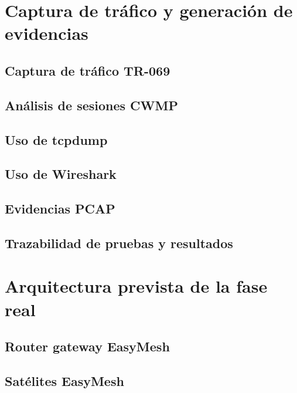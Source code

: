 \section{Captura de tráfico y generación de evidencias}
\label{sec:captura-trafico-generacion-evidencias}

\subsection{Captura de tráfico TR-069}
\label{subsec:captura-trafico-tr069}

\subsection{Análisis de sesiones CWMP}
\label{subsec:analisis-sesiones-cwmp}

\subsection{Uso de tcpdump}
\label{subsec:uso-tcpdump}

\subsection{Uso de Wireshark}
\label{subsec:uso-wireshark}

\subsection{Evidencias PCAP}
\label{subsec:evidencias-pcap}

\subsection{Trazabilidad de pruebas y resultados}
\label{subsec:trazabilidad-pruebas-resultados}


\section{Arquitectura prevista de la fase real}
\label{sec:arquitectura-prevista-fase-real}

\subsection{Router gateway EasyMesh}
\label{subsec:router-gateway-easymesh}

\subsection{Satélites EasyMesh}
\label{subsec:satelites-easymesh}

